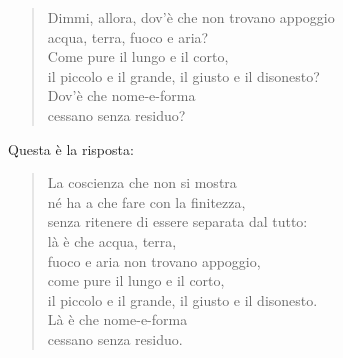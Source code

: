 \begin{quote}
Dimmi, allora, dov’è che non trovano appoggio \\
acqua, terra, fuoco e aria? \\
Come pure il lungo e il corto, \\
il piccolo e il grande, il giusto e il disonesto? \\
Dov’è che nome-e-forma \\
cessano senza residuo?
\end{quote}

Questa è la risposta:


\begin{quote}
\label{pag167}La coscienza che non si mostra \\
né ha a che fare con la finitezza, \\
senza ritenere di essere separata dal tutto: \\
là è che acqua, terra, \\
fuoco e aria non trovano appoggio, \\
come pure il lungo e il corto, \\
il piccolo e il grande, il giusto e il disonesto. \\
Là è che nome-e-forma \\
cessano senza residuo.
\end{quote}



